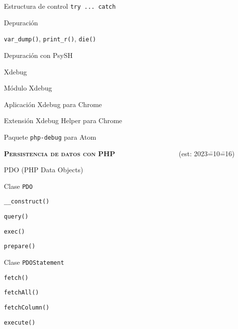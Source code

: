 \begin{longenum}
\begin{longenum}
\begin{longenum}
            \item Estructura de control \texttt{try ... catch}
        \end{longenum}
        \item Depuración
        \begin{longenum}
            \item \texttt{var\_dump()}, \texttt{print\_r()}, \texttt{die()}
            \item Depuración con PsySH
            \item Xdebug \opcional\
            \begin{longenum}
                \item Módulo Xdebug
                \item Aplicación Xdebug para Chrome
                \item Extensión Xdebug Helper para Chrome
                \item Paquete \texttt{php-debug} para Atom
            \end{longenum}
        \end{longenum}
    \end{longenum}
    \item \textbf{\textsc{Persistencia de datos con PHP}} \ \ \ \ \ \ \ \ \ \ \ \ \ \ \ \ \ \ (est: 2023\==10\==16)
    \begin{longenum}
        \item PDO (PHP Data Objects)
        \begin{longenum}
            \item Clase \texttt{PDO}
            \begin{longenum}
                \item \texttt{\_\_construct()}
                \item \texttt{query()}
                \item \texttt{exec()}
                \item \texttt{prepare()}
            \end{longenum}
            \item Clase \texttt{PDOStatement}
            \begin{longenum}
                \item \texttt{fetch()}
                \item \texttt{fetchAll()}
                \item \texttt{fetchColumn()}
                \item \texttt{execute()}

\end{longenum}
\end{longenum}
\end{longenum}
\end{longenum}
